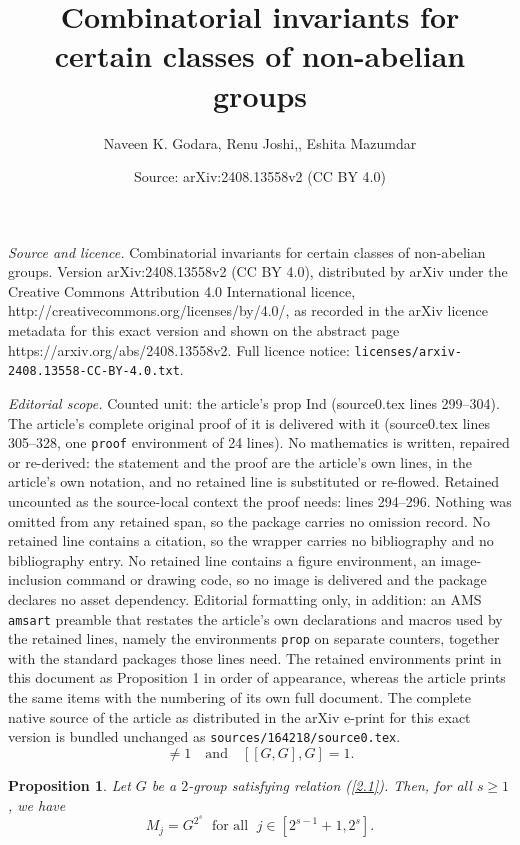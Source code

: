 \documentclass[10pt,a4paper]{amsart}
\title{Combinatorial invariants for certain classes of non-abelian groups}
\author{Naveen K. Godara, Renu Joshi,, Eshita Mazumdar}
\date{Source: arXiv:2408.13558v2 (CC BY 4.0)}
\newtheorem{prop}{Proposition}
\begin{document}
\maketitle

\noindent\emph{Source and licence.} Combinatorial invariants for certain classes of non-abelian groups. Version arXiv:2408.13558v2 (CC BY 4.0), distributed by arXiv under the Creative Commons Attribution 4.0 International licence, http://creativecommons.org/licenses/by/4.0/, as recorded in the arXiv licence metadata for this exact version and shown on the abstract page https://arxiv.org/abs/2408.13558v2. Full licence notice: \texttt{licenses/arxiv-2408.13558-CC-BY-4.0.txt}.\par\smallskip

\noindent\textit{Editorial scope.} Counted unit: the article's prop Ind (source0.tex lines 299--304). The article's complete original proof of it is delivered with it (source0.tex lines 305--328, one \texttt{proof} environment of 24 lines). No mathematics is written, repaired or re-derived: the statement and the proof are the article's own lines, in the article's own notation, and no retained line is substituted or re-flowed.  Retained uncounted as the source-local context the proof needs: lines 294--296.  Nothing was omitted from any retained span, so the package carries no omission record.  No retained line contains a citation, so the wrapper carries no bibliography and no bibliography entry.  No retained line contains a figure environment, an image-inclusion command or drawing code, so no image is delivered and the package declares no asset dependency.  Editorial formatting only, in addition: an AMS \texttt{amsart} preamble that restates the article's own declarations and macros used by the retained lines, namely the environments \texttt{prop} on separate counters, together with the standard packages those lines need.  The retained environments print in this document as Proposition 1 in order of appearance, whereas the article prints the same items with the numbering of its own full document.  The complete native source of the article as distributed in the arXiv e-print for this exact version is bundled unchanged as \texttt{sources/164218/source0.tex}.
\begin{equation}
[G,G] \neq 1 \quad \text{and}\quad [[G,G],G]=1. \label{2.1}
\end{equation}

\begin{prop}\label{Ind} 
Let $G$ be a $2$-group satisfying relation \emph{(\ref{2.1})}. Then, for all $s \geq 1$, we have 
\begin{equation*}\label{equationinduction}
M_j=G^{2^{s}} \;\text{ for all }\; j \in [2^{s-1}+1, 2^s].
\end{equation*}
\end{prop}
\end{document}
